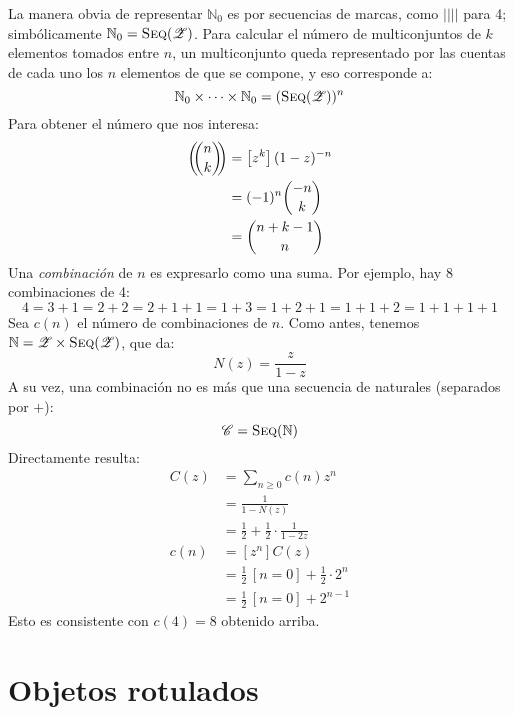   La manera obvia de representar \(\mathbb{N}_0\)
  es por secuencias de marcas,
  como \(||||\) para 4;
  simbólicamente \(\mathbb{N}_0 = \operatorname{\textsc{Seq}}(\mathscr{Z})\).
  Para calcular el número de multiconjuntos de \(k\) elementos
  tomados entre \(n\),
  un multiconjunto queda representado
  por las cuentas de cada uno los \(n\) elementos de que se compone,
  y eso corresponde a:
  \begin{equation*}
    \mathbb{N}_0 \times \dotsb \times \mathbb{N}_0
      = (\operatorname{\textsc{Seq}}(\mathscr{Z}))^n
  \end{equation*}
  Para obtener el número que nos interesa:
  \begin{align*}
    \left( \!\! \binom{n}{k} \!\! \right)
      &= \left[ z^k \right] (1 - z)^{-n} \\
      &= (-1)^n \binom{-n}{k} \\
      &= \binom{n + k - 1}{n}
  \end{align*}
  Una \emph{combinación} de \(n\) es expresarlo como una suma.
  Por ejemplo,
  hay \num{8} combinaciones de \num{4}:
  \begin{equation*}
      4
        = 3 + 1
        = 2 + 2
        = 2 + 1 + 1
        = 1 + 3
        = 1 + 2 + 1
        = 1 + 1 + 2
        = 1 + 1 + 1 + 1
  \end{equation*}
  Sea \(c(n)\) el número de combinaciones de \(n\).
  Como antes,
  tenemos \(\mathbb{N} = \mathscr{Z} \times \operatorname{\textsc{Seq}}(\mathscr{Z})\),
  que da:
  \begin{equation*}
    N(z)
      = \frac{z}{1 - z}
  \end{equation*}
  A su vez,
  una combinación no es más que una secuencia de naturales
  (separados por \(+\)):
  \begin{equation*}
    \mathscr{C}
      = \operatorname{\textsc{Seq}}(\mathbb{N})
  \end{equation*}
  Directamente resulta:
  \begin{align*}
    C(z)
      &= \sum_{n \ge 0} c(n) z^n \\
      &= \frac{1}{1 - N(z)} \\
      &= \frac{1}{2} + \frac{1}{2} \cdot \frac{1}{1 - 2 z} \\
    c(n)
      &= [z^n] C(z) \\
      &= \frac{1}{2} \, [n = 0] + \frac{1}{2} \cdot 2^n \\
      &= \frac{1}{2} \, [n = 0] + 2^{n - 1}
  \end{align*}
  Esto es consistente con \(c(4) = 8\) obtenido arriba.

\section{Objetos rotulados}
\label{sec:objetos-rotulados}

